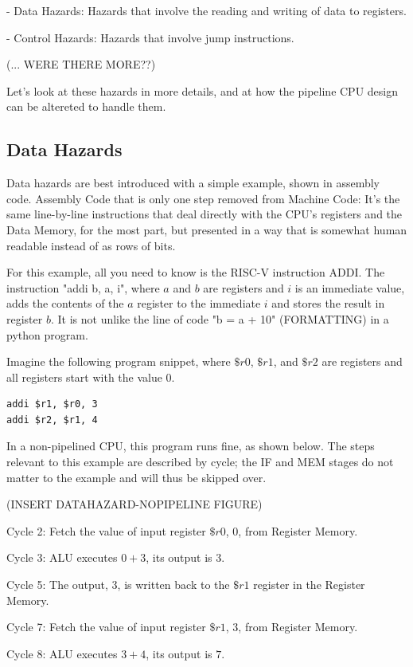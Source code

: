 \documentclass[12pt,twoside]{reedthesis}
\begin{document}
- Data Hazards: Hazards that involve the reading and writing of data to registers.

- Control Hazards: Hazards that involve jump instructions.

(... WERE THERE MORE??)

Let's look at these hazards in more details, and at how the pipeline CPU design can be altereted to handle them.

\subsection{Data Hazards}

Data hazards are best introduced with a simple example, shown in assembly code. Assembly Code that is only one step removed from Machine Code: It's the same line-by-line instructions that deal directly with the CPU's registers and the Data Memory, for the most part, but presented in a way that is somewhat human readable instead of as rows of bits.

For this example, all you need to know is the RISC-V instruction ADDI. The instruction "addi b, a, i", where $a$ and $b$ are registers and $i$ is an immediate value, adds the contents of the $a$ register to the immediate $i$ and stores the result in register $b$. It is not unlike the line of code "b = a + 10" (FORMATTING) in a python program.

Imagine the following program snippet, where $\$r0$, $\$r1$, and $\$r2$ are registers and all registers start with the value 0.

\begin{verbatim}
addi $r1, $r0, 3
addi $r2, $r1, 4
\end{verbatim}

In a non-pipelined CPU, this program runs fine, as shown below. The steps relevant to this example are described by cycle; the IF and MEM stages do not matter to the example and will thus be skipped over.

(INSERT DATAHAZARD-NOPIPELINE FIGURE)

Cycle 2: Fetch the value of input register $\$r0$, $0$, from Register Memory.

Cycle 3: ALU executes $0 + 3$, its output is $3$.

Cycle 5: The output, $3$, is written back to the $\$r1$ register in the Register Memory.

Cycle 7: Fetch the value of input register $\$r1$, $3$, from Register Memory.

Cycle 8: ALU executes $3 + 4$, its output is $7$.
\end{document}
